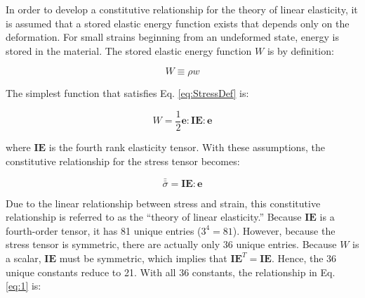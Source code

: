 \documentclass[10pt]{article}
\begin{document}
In order to develop a constitutive relationship for the theory of linear elasticity, it is assumed that a stored elastic energy function exists that depends only on the deformation. For small strains beginning from an undeformed state, energy is stored in the material. The stored elastic energy function \(W\) is by definition:

\begin{equation}
W\equiv \rho w
\end{equation}

The simplest function that satisfies Eq. \eqref{eq:StressDef} is:

\begin{equation}
W=\frac{1}{2}\textbf{e}:\textbf{IE}:\textbf{e}
\end{equation}

where \(\textbf{IE}\) is the fourth rank elasticity tensor. With these assumptions, the constitutive relationship for the stress tensor becomes:

\begin{equation}
\label{eq:1}
\bar{\bar{\sigma}}=\textbf{IE}:\textbf{e}
\end{equation}

Due to the linear relationship between stress and strain, this constitutive relationship is referred to as the ``theory of linear elasticity.'' Because \(\textbf{IE}\) is a fourth-order tensor, it has 81 unique entries (\(3^4=81\)). However, because the stress tensor is symmetric, there are actually only 36 unique entries. Because \(W\) is a scalar, \(\textbf{IE}\) must be symmetric, which implies that \(\textbf{IE}^T=\textbf{IE}\). Hence, the 36 unique constants reduce to 21. With all 36 constants, the relationship in Eq. \eqref{eq:1} is:
\end{document}
